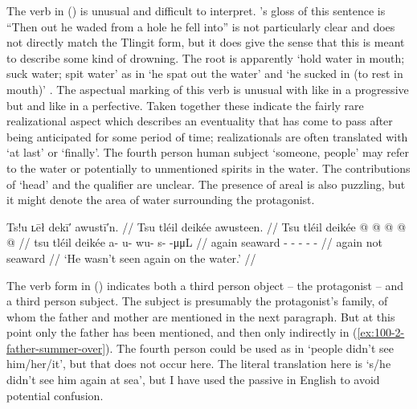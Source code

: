 The verb  in (\lastx) is unusual and difficult to interpret.
\citeauthor{swanton:1909}’s gloss of this sentence is “Then out he waded from a hole he fell into” is not particularly clear and does not directly match the Tlingit form, but it does give the sense that this is meant to describe some kind of drowning.
The root is apparently  ‘hold water in mouth; suck water; spit water’ as in  ‘he spat out the water’ \parencite[204]{story-naish:1973} and  ‘he sucked in (to rest in mouth)’ \parencite[f06/129]{leer:1973}.
The aspectual marking of this verb is unusual with  like in a progressive but  and  like in a perfective.
Taken together these indicate the fairly rare realizational aspect \parencite[208, 378–381]{leer:1991} which describes an eventuality that has come to pass after being anticipated for some period of time; realizationals are often translated with ‘at last’ or ‘finally’.
The fourth person human subject  ‘someone, people’ may refer to the water or potentially to unmentioned spirits in the water.
The contributions of  ‘head’ and the qualifier  are unclear.
The presence of areal  is also puzzling, but it might denote the area of water surrounding the protagonist.

\ex\label{ex:100-17-not-seen}%
%
\begingl
	\glpreamble	Ts!u ʟēł dekī′ awustī′n. //
	\glpreamble	Tsu tléil deikée awusteen. //
	\gla	Tsu tléil deikée  @ {} @ {} @ {} @ {} @ {} //
	\glb	tsu tléil deikée a- u- wu- s-  -μμL //
	\glc	again  seaward - - - -  - //
	\gld	again not seaward  {} {} {} {} {} //
	\glft	‘He wasn’t seen again on the water.’
		//
\endgl
\xe

The verb form in (\lastx) indicates both a third person object – the protagonist – and a third person subject.
The subject is presumably the protagonist’s family, of whom the father and mother are mentioned in the next paragraph.
But at this point only the father has been mentioned, and then only indirectly in (\ref{ex:100-2-father-summer-over}).
The fourth person  could be used as in  ‘people didn’t see him/her/it’, but that does not occur here.
The literal translation here is ‘s/he didn’t see him again at sea’, but I have used the passive in English to avoid potential confusion.

